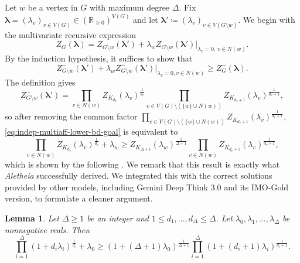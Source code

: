 \documentclass{article}
\numberwithin{equation}{section}
\theoremstyle{plain}
\newtheorem{lemma}[theorem]{Lemma}
\theoremstyle{definition}
\theoremstyle{remark} %
\newcommand{\defeq}{\coloneqq}
\newcommand{\RR}{\mathbb{R}}
\newcommand{\blambda}{\bm{\lambda}}
\newcommand{\Aletheia}{\emph{Aletheia}}
\begin{document}
Let \(w\) be a vertex in \(G\) with maximum degree \(\Delta\). Fix \(\blambda=(\lambda_v)_{v\in V(G)}\in (\RR_{\ge0})^{V(G)}\) and let \(\blambda'\defeq (\lambda_v)_{v\in V(G \setminus w)}\). We begin with the multivariate recursive expression
\[
	Z_G(\blambda) = Z_{G \setminus w}(\blambda') + \lambda_w Z_{G \setminus w}(\blambda')|_{\lambda_v = 0,\, v \in N(w)}.
\]
By the induction hypothesis, it suffices to show that
\begin{equation}\label{eq:indep-multiaff-lower-bd-goal}
	Z^-_{G \setminus w}(\blambda') + \lambda_w Z^-_{G\setminus w}(\blambda')|_{\lambda_v = 0, v \in N(w)}
	\ge Z^-_G(\blambda).
\end{equation}
The definition gives
\[
	Z^-_{G \setminus w}(\blambda')
	= \prod_{v\in N(w)} Z_{K_{d_v}}(\lambda_v)^{\frac{1}{d_v}}
		\prod_{v \in V(G)\setminus (\{w\}\cup N(w))} Z_{K_{d_v+1}}(\lambda_v)^{\frac{1}{d_v+1}},
\]
so after removing the common factor \(\prod\limits_{v\in V(G)\setminus (\{w\}\cup N(w))} Z_{K_{d_v+1}}(\lambda_v)^{\frac{1}{d_v+1}}\), \eqref{eq:indep-multiaff-lower-bd-goal} is equivalent to
\begin{equation}\label{eq:indep-multiaff-lower-bd-goal-2}
	\prod_{v\in N(w)} Z_{K_{d_v}}(\lambda_v)^{\frac{1}{d_v}}
		+ \lambda_w
	\ge Z_{K_{\Delta+1}}(\lambda_w)^{\frac{1}{\Delta+1}}
		\prod_{v\in N(w)} Z_{K_{d_v+1}}(\lambda_v)^{\frac{1}{d_v+1}},
\end{equation}
which is shown by the following .
We remark that this result is exactly what {\Aletheia} successfully derived. We integrated this with the correct solutions provided by other models, including Gemini Deep Think 3.0 and its IMO-Gold version, to formulate a cleaner argument.

\begin{lemma}\label{lem:key-tech-ineq}
    Let \(\Delta\ge 1\) be an integer and \(1\le d_1,\dots,d_\Delta\le \Delta\). Let \(\lambda_0,\lambda_1,\dots,\lambda_\Delta\) be nonnegative reals. Then
    \[
        \prod_{i=1}^\Delta (1+d_i \lambda_i)^{\frac{1}{d_i}} + \lambda_0
        \ge (1+(\Delta+1)\lambda_0)^{\frac{1}{\Delta+1}} \prod_{i=1}^\Delta (1+(d_i+1)\lambda_i)^{\frac{1}{d_i+1}}.
    \]
\end{lemma}
\end{document}
